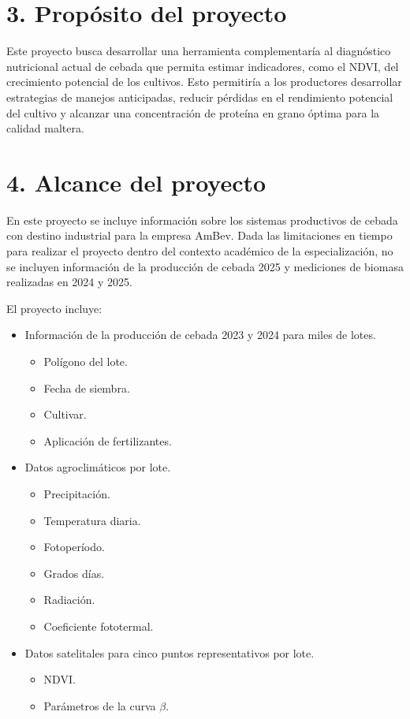 \documentclass[
11pt, %
]{charter}
\begin{document}
\section{3. Propósito del proyecto}
\label{sec:proposito}

Este proyecto busca desarrollar una herramienta complementaría al diagnóstico nutricional actual de cebada que permita estimar indicadores, como el NDVI, del crecimiento potencial de los cultivos. Esto permitiría a los productores desarrollar estrategias de manejos anticipadas, reducir pérdidas en el rendimiento potencial del cultivo y alcanzar una concentración de proteína en grano óptima para la calidad maltera. 


\section{4. Alcance del proyecto}
\label{sec:alcance}

En este proyecto se incluye información sobre los sistemas productivos de cebada con destino industrial para la empresa AmBev. Dada las limitaciones en tiempo para realizar el proyecto dentro del contexto académico de la especialización, no se incluyen información de la producción de cebada 2025 y mediciones de biomasa realizadas en 2024 y 2025.

El proyecto incluye:
\begin{itemize}
	\item Información de la producción de cebada 2023 y 2024 para miles de lotes.
		\begin{itemize}
		\item Polígono del lote.
		\item Fecha de siembra.
		\item Cultivar.
		\item Aplicación de fertilizantes.	
		\end{itemize}
	\item Datos agroclimáticos por lote.
		\begin{itemize}
		\item Precipitación.
		\item Temperatura diaria.
		\item Fotoperíodo.
		\item Grados días.
		\item Radiación.
		\item Coeficiente fototermal.		
		\end{itemize}
	\item Datos satelitales para cinco puntos representativos por lote.
		\begin{itemize}
		\item NDVI.
		\item Parámetros de la curva $\beta$.
		\end{itemize}
	
\end{itemize}
\end{document}
